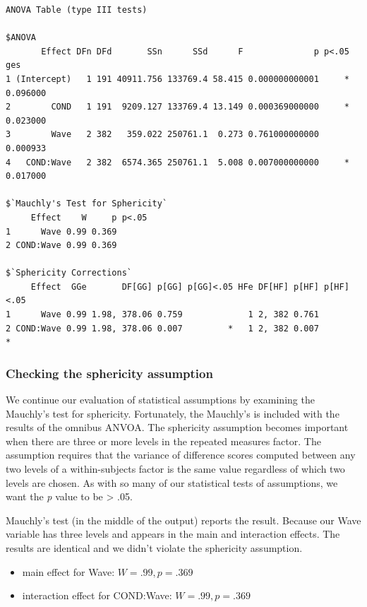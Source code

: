 \documentclass[
  11pt,
]{book}
\providecommand{\tightlist}{%
  \setlength{\itemsep}{0pt}\setlength{\parskip}{0pt}}
\begin{document}
\begin{verbatim}
ANOVA Table (type III tests)

$ANOVA
       Effect DFn DFd       SSn      SSd      F              p p<.05      ges
1 (Intercept)   1 191 40911.756 133769.4 58.415 0.000000000001     * 0.096000
2        COND   1 191  9209.127 133769.4 13.149 0.000369000000     * 0.023000
3        Wave   2 382   359.022 250761.1  0.273 0.761000000000       0.000933
4   COND:Wave   2 382  6574.365 250761.1  5.008 0.007000000000     * 0.017000

$`Mauchly's Test for Sphericity`
     Effect    W     p p<.05
1      Wave 0.99 0.369      
2 COND:Wave 0.99 0.369      

$`Sphericity Corrections`
     Effect  GGe       DF[GG] p[GG] p[GG]<.05 HFe DF[HF] p[HF] p[HF]<.05
1      Wave 0.99 1.98, 378.06 0.759             1 2, 382 0.761          
2 COND:Wave 0.99 1.98, 378.06 0.007         *   1 2, 382 0.007         *
\end{verbatim}

\hypertarget{checking-the-sphericity-assumption}{%
\subsubsection{Checking the sphericity assumption}\label{checking-the-sphericity-assumption}}

We continue our evaluation of statistical assumptions by examining the Mauchly's test for sphericity. Fortunately, the Mauchly's is included with the results of the omnibus ANVOA. The sphericity assumption becomes important when there are three or more levels in the repeated measures factor. The assumption requires that the variance of difference scores computed between any two levels of a within-subjects factor is the same value regardless of which two levels are chosen. As with so many of our statistical tests of assumptions, we want the \emph{p} value to be \textgreater{} .05.

Mauchly's test (in the middle of the output) reports the result. Because our Wave variable has three levels and appears in the main and interaction effects. The results are identical and we didn't violate the sphericity assumption.

\begin{itemize}
\tightlist
\item
  main effect for Wave: \(W = .99, p = .369\)
\item
  interaction effect for COND:Wave: \(W = .99, p = .369\)
\end{itemize}
\end{document}
